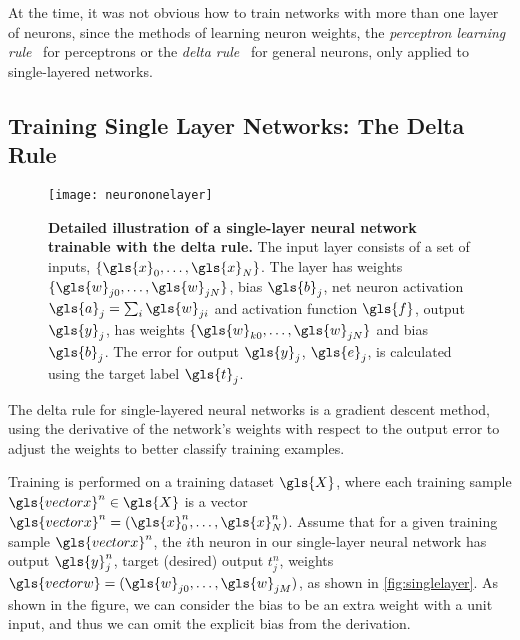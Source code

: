 \documentclass[thesis]{subfiles}
\begin{document}
At the time, it was not obvious how to train networks with more than one layer of neurons, since the methods of learning neuron weights, the \emph{perceptron learning rule}~\citep{rosenblatt1961principles} for perceptrons or the \emph{delta rule}~\citep{widrow1960adaptive} for general neurons, only applied to single-layered networks. %

\subsection{Training Single Layer Networks: The Delta Rule}
\label{deltarule}
\begin{figure}[tbp]
\centering
\texttt{[image: neurononelayer]}
\caption[Detailed illustration of a single-layer neural network]{\textbf{Detailed illustration of a single-layer neural network trainable with the delta rule.} The input layer consists of a set of inputs, $\{\gls{x}_{0}, \ldots, \gls{x}_{N}\}$. The layer has weights $\{\gls{w}_{j0}, \ldots, \gls{w}_{jN}\}$, bias $\gls{b}_j$, net neuron activation $\gls{a}_j = \sum_i \gls{w}_{ji}$ and activation function $\gls{f}$, output $\gls{y}_j$, has weights $\{\gls{w}_{k0}, \ldots, \gls{w}_{jN}\}$ and bias $\gls{b}_j$. The error for output $\gls{y}_j$, $\gls{e}_j$, is calculated using the target label $\gls{t}_j$.}
\label{fig:neurononelayer}
\end{figure}

The delta rule for single-layered neural networks is a gradient descent method, using the derivative of the network's weights with respect to the output error to adjust the weights to better classify training examples.

Training is performed on a training dataset $\gls{X}$, where each training sample $\gls{vectorx}^n\in \gls{X}$ is a vector $\gls{vectorx}^n = (\gls{x}^n_0, \ldots, \gls{x}^n_N)$. Assume that for a given training sample $\gls{vectorx}^n$, the $i$th neuron in our single-layer neural network has output $\gls{y}^n_j$, target (desired) output $t^n_j$, weights $\gls{vectorw}=(\gls{w}_{j0}, \ldots, \gls{w}_{jM})$, as shown in \cref{fig:singlelayer}. As shown in the figure, we can consider the bias to be an extra weight with a unit input, and thus we can omit the explicit bias from the derivation. 
\end{document}
